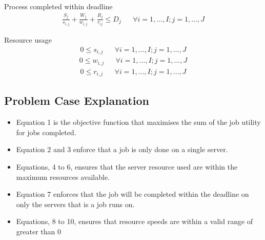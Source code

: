 \documentclass[fleqn]{article}
\begin{document}
Process completed within deadline
\begin{align}
    \frac{S_j}{s_{i,j}} + \frac{W_j}{w_{i,j}} + \frac{R_j}{r_{ij}} \leq D_j && \forall i = 1,\dots,I; j = 1,\dots,J
\end{align}

Resource usage
\begin{align}
    0 \le s_{i,j} && \forall i = 1,\dots,I; j = 1,\dots,J
\end{align}
\begin{align}
    0 \le w_{i,j} && \forall i = 1,\dots,I; j = 1,\dots,J
\end{align}
\begin{align}
    0 \le r_{i,j} && \forall i = 1,\dots,I; j = 1,\dots,J
\end{align}

\subsection{Problem Case Explanation}\label{subsec:problem-case-explanation}
\begin{itemize}
    \item Equation 1 is the objective function that maximises the sum of the job utility for jobs completed.
    \item Equation 2 and 3 enforce that a job is only done on a single server.
    \item Equations, 4 to 6, ensures that the server resource used are within the maximum resources available.
    \item Equation 7 enforces that the job will be completed within the deadline on only the servers that is a job runs on.
    \item Equations, 8 to 10, ensures that resource speeds are within a valid range of greater than 0
\end{itemize}
\end{document}
